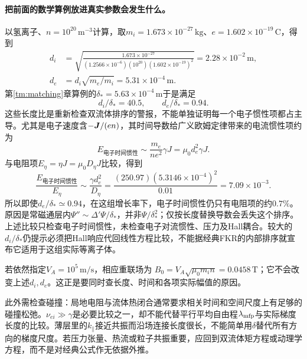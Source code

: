 \paragraph{把前面的数学算例放进真实参数会发生什么。}
以氢离子、$n=10^{20}\,\mathrm{m^{-3}}$计算，取$m_i=1.673\times10^{-27}\,\mathrm{kg}$、$e=1.602\times10^{-19}\,\mathrm C$，得到
\begin{align}
 d_i&=\sqrt{\frac{1.673\times10^{-27}}
 {(1.2566\times10^{-6})(10^{20})(1.602\times10^{-19})^2}}
 =2.28\times10^{-2}\,\mathrm m,\\
 d_e&=d_i\sqrt{m_e/m_i}=5.31\times10^{-4}\,\mathrm m.
\end{align}
第\ref{tm:matching}章算例的$\delta_*=5.63\times10^{-4}\,\mathrm m$于是满足
\begin{equation}
 d_i/\delta_*=40.5,\qquad d_e/\delta_*=0.94.
\end{equation}
这些长度比是重新检查双流体排序的警报，不能单独证明每一个电子惯性项都占主导。尤其是电子速度含$-\bm{J}/(en)$，其时间导数给广义欧姆定律带来的电流惯性项约为
\begin{equation}
 E_{\text{电子时间惯性}}
 \sim\frac{m_e}{ne^2}\gamma J
 =\mu_0d_e^2\gamma J.
\end{equation}
与电阻项$E_\eta=\eta J=\mu_0D_\eta J$比较，得到
\begin{equation}
 \frac{E_{\text{电子时间惯性}}}{E_\eta}
 \sim\frac{\gamma d_e^2}{D_\eta}
 =\frac{(250.97)(5.3146\times10^{-4})^2}{0.01}
 =7.09\times10^{-3}.
\end{equation}
所以即使$d_e/\delta_*\simeq0.94$，在这组增长率下，电子时间惯性仍只有电阻项的约$0.7\%$。原因是常磁通层内$\Psi''\sim\Delta'\Psi/\delta_*$，并非$\Psi/\delta_*^2$；仅按长度替换导数会丢失这个排序。上述比较只检查电子时间惯性，未检查电子对流惯性、压力及Hall耦合。较大的$d_i/\delta_*$仍提示必须把Hall响应代回线性方程比较，不能据经典FKR的内部排序就宣布它适用于这组实际等离子体。

若依然指定$V_A=10^5\,\mathrm{m/s}$，相应重联场为
$B_0=V_A\sqrt{\mu_0m_in}=0.0458\,\mathrm T$；它不会改变上述$d_i,d_e$。这正是要同时查长度、时间和各项实际幅值的原因。

此外需检查碰撞：局地电阻与流体热闭合通常要求相关时间和空间尺度上有足够的碰撞松弛。$\nu_{ei}\gg\gamma$是必要比较之一，却不能代替平行平均自由程$\lambda_{\rm mfp}$与实际梯度长度的比较。薄层里的$k_\parallel$接近共振而沿场连接长度很长，不能简单用$\delta$替代所有方向的梯度尺度。若压力张量、热流或粒子共振重要，应回到双流体矩方程或动理学方程，而不是对经典公式作无依据外推。


